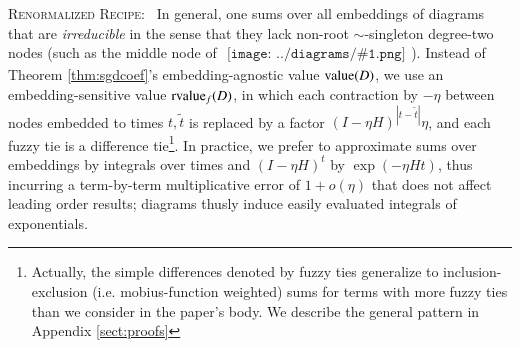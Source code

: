 \documentclass{article}
\newcommand{\dvalue}{\text{\textnormal{value}}}
\newcommand{\rvalue}{\text{\textnormal{rvalue}}}
\newcommand{\wabs}[1]{\left|#1\right|}
\newcommand{\sdia}[1]{\begin{gathered}\texttt{[image: ../diagrams/\#1.png]}\end{gathered}}
\begin{document}
        \textsc{Renormalized Recipe:}~
        In general, one sums over all embeddings of diagrams that are
        \emph{irreducible} in the sense that they lack non-root
        $\sim$-singleton degree-two nodes (such as the middle node of
        $\sdia{(0-1-2)(01-12)}$).  Instead of Theorem \ref{thm:sgdcoef}'s
        embedding-agnostic value $\dvalue(D)$, we use an embedding-sensitive
        value $\rvalue_f(D)$, in which each contraction by $-\eta$ between
        nodes embedded to times $t, \tilde t$ is replaced by a factor $(I-\eta
        H)^{\wabs{t-\tilde t}} \eta$, and each fuzzy tie is a difference
        tie\footnote{
            Actually, the simple differences denoted by fuzzy ties generalize
            to inclusion-exclusion (i.e. mobius-function weighted) sums for
            terms with more fuzzy ties than we consider in the paper's body.
            We describe the general pattern in Appendix \ref{sect:proofs} 
        }.
        In practice, we prefer to approximate sums over embeddings by integrals
        over times and $(I-\eta H)^t$ by $\exp(- \eta H t)$, thus incurring a
        term-by-term multiplicative error of $1 + o(\eta)$ that does not affect
        leading order results; diagrams thusly induce easily
        evaluated integrals of exponentials.
       
\end{document}
